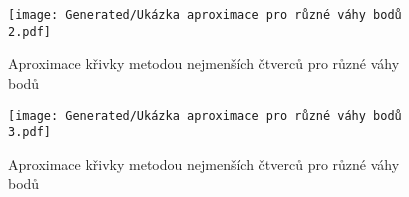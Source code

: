 \begin{imagepage}
    \begin{figure}[H]
        \centering
        \texttt{[image: Generated/Ukázka aproximace pro různé váhy bodů 2.pdf]}
        \caption{Aproximace křivky metodou nejmenších čtverců pro různé váhy bodů}
        \label{fig:Demo aproximace pro různé váhy 2}
    \end{figure}
    \begin{figure}[H]
        \centering
        \texttt{[image: Generated/Ukázka aproximace pro různé váhy bodů 3.pdf]}
        \caption{Aproximace křivky metodou nejmenších čtverců pro různé váhy bodů}
        \label{fig:Demo aproximace pro různé váhy 3}
    \end{figure}
\end{imagepage}